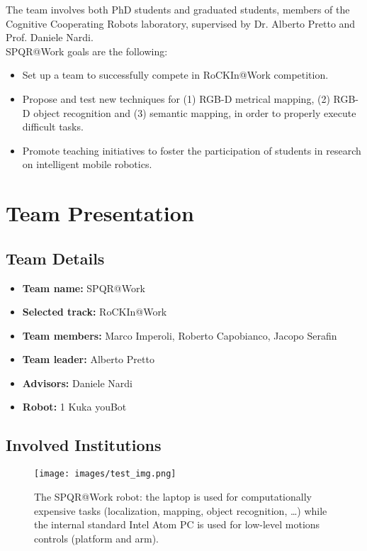 \documentclass[conference]{IEEEtran}
\begin{document}
The team involves both PhD students and graduated students, members of the Cognitive Cooperating Robots laboratory, supervised by Dr. Alberto Pretto and Prof. Daniele Nardi.\\ 

SPQR@Work goals are the following:
\begin{itemize}
 \item Set up a team to successfully compete in RoCKIn@Work competition.
 \item Propose and test new techniques for (1) RGB-D metrical mapping, (2) RGB-D object recognition and (3) semantic mapping, in order to properly execute difficult tasks.
 \item Promote teaching initiatives to foster the participation of students in research on intelligent mobile robotics.
\end{itemize}
 
\section{Team Presentation}
\subsection{Team Details}

\begin{itemize}
 \item \textbf{Team name:} SPQR@Work
 \item \textbf{Selected track:} RoCKIn@Work
 \item \textbf{Team members:} Marco Imperoli, Roberto Capobianco, Jacopo Serafin
  \item \textbf{Team leader:} Alberto Pretto
 \item \textbf{Advisors:} Daniele Nardi
 \item \textbf{Robot:} 1 Kuka youBot
\end{itemize}

\subsection{Involved Institutions}
\begin{figure}[t!]
\begin{center}
\texttt{[image: images/test\_img.png]}
\end{center}
\caption{The SPQR@Work robot: the laptop is used for computationally expensive tasks (localization, mapping, object recognition, \dots) while the internal standard Intel Atom PC is used for low-level motions controls (platform and arm).}\label{fig:robot}
\end{figure}
\end{document}
